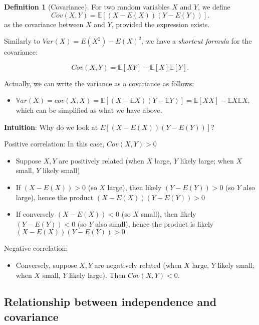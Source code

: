 \documentclass[
]{book}
\providecommand{\tightlist}{%
  \setlength{\itemsep}{0pt}\setlength{\parskip}{0pt}}
\theoremstyle{definition}
\newtheorem{definition}{Definition}[chapter]
\theoremstyle{definition}
\theoremstyle{definition}
\theoremstyle{definition}
\theoremstyle{remark}
\begin{document}
\begin{definition}[Covariance]
For two random variables \(X\) and \(Y\), we define
\[
Cov(X,Y) = \mathbb{E}\left[ (X - E(X))(Y-E(Y)) \right].
\]
as the covariance between \(X\) and \(Y\), provided the expression exists.
\end{definition}

Similarly to \(Var(X)=E(X^2)-E(X)^2\), we have a \emph{shortcut formula} for the covariance:

\[
Cov(X,Y) = \mathbb{E}[XY] - \mathbb{E}[X] \mathbb{E}[Y].
\]

Actually, we can write the variance as a covariance as follows:

\begin{itemize}
\tightlist
\item
  \(\mathbb{V}ar(X) = cov(X,X) = \mathbb{E}[(X-\mathbb{E}X)(Y-\mathbb{E}Y)] = \mathbb{E}[XX] - \mathbb{E}X \mathbb{E}X\), which can be simplified as what we have above.
\end{itemize}

\textbf{Intuition}:
Why do we look at \(E \left[ (X - E(X))(Y-E(Y)) \right]\)?

Positive correlation: In this case, \(Cov(X,Y)>0\)

\begin{itemize}
\tightlist
\item
  Suppose \(X,Y\) are positively related (when \(X\) large, \(Y\) likely large; when \(X\) small, \(Y\) likely small)
\item
  If \((X-E(X))>0\) (so \(X\) large), then likely \((Y-E(Y))>0\) (so \(Y\) also large), hence the product \((X-E(X))(Y-E(Y))>0\)
\item
  If conversely \((X-E(X))<0\) (so \(X\) small), then likely \((Y-E(Y))<0\) (so \(Y\) also small), hence the product is likely \((X-E(X))(Y-E(Y))>0\)
\end{itemize}

Negative correlation:

\begin{itemize}
\tightlist
\item
  Conversely, suppose \(X,Y\) are negatively related (when \(X\) large, \(Y\) likely small; when \(X\) small, \(Y\) likely large). Then \(Cov(X,Y)<0\).
\end{itemize}

\subsection{Relationship between independence and covariance}\label{relationship-between-independence-and-covariance}
\end{document}
